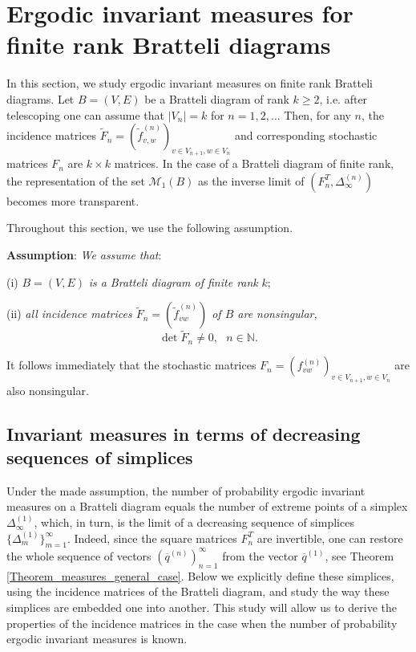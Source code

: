 \documentclass[11pt, english, reqno]{amsart}
\theoremstyle{definition}
\theoremstyle{remark}
\theoremstyle{plain}
\def\ov{\overline}
\def\tl{\widetilde}
\numberwithin{equation}{section}
\begin{document}
\section{Ergodic invariant measures for finite rank Bratteli diagrams }
\label{sect 4}

In this section, we  study ergodic invariant measures on finite rank
 Bratteli diagrams. Let $B=(V,E)$ be a Bratteli diagram of rank $k\geq2$,
  i.e. after telescoping one can assume that $|V_n| = k$ for $n = 1,2,\ldots$
Then, for any $n$, the incidence matrices $\tl F_n =
(\tl f_{v,w}^{(n)})_{v \in V_{n+1},
 w \in V_n}$ and corresponding stochastic matrices $F_n$ are $k \times k$
  matrices. In the case of a Bratteli diagram of finite rank,
the representation of the set $\mathcal{M}_1(B)$ as the inverse limit of
$(F_n^T, \Delta_{\infty}^{(n)})$  becomes more transparent.

Throughout this section, we use the following assumption.

\medskip
\noindent
\textbf{Assumption}: \textit{We  assume that}:

(i) $B = (V,E)$ \textit{is a Bratteli diagram of finite rank} $k$;

(ii) \textit{all incidence matrices $\tl F_n = (\tl f^{(n)}_{vw})$ of
$B$ are  nonsingular,}
  $$
  \det \tl F_n \neq 0, \ \ \ n\in \mathbb N.
  $$
\medskip

It follows immediately that  the stochastic matrices $F_n =
(f_{vw}^{(n)})_{v\in V_{n+1}, w \in V_n}$ are also nonsingular. 


\subsection{Invariant measures in terms of decreasing sequences of
 simplices}\label{subsec4.1}

Under the made assumption, the number of probability ergodic
invariant measures on a Bratteli diagram equals the number of extreme points of a
simplex $\Delta_{\infty}^{(1)}$, which, in turn, is the limit of a decreasing
sequence of simplices $\{\Delta_{m}^{(1)}\}_{m=1}^{\infty}$. Indeed,
since the square matrices $F_n^T$  are  invertible, one can
restore the whole sequence of vectors
  $(\ov q^{(n)})_{n=1}^{\infty}$ from the vector $\ov q^{(1)}$,
see  Theorem \ref{Theorem_measures_general_case}.
Below we explicitly define these simplices, using the incidence matrices
 of the Bratteli
diagram, and  study the way these simplices are embedded one into
another. This study will allow us to derive the properties of the incidence
matrices in the case when the number of probability ergodic invariant
 measures is known.
\end{document}
